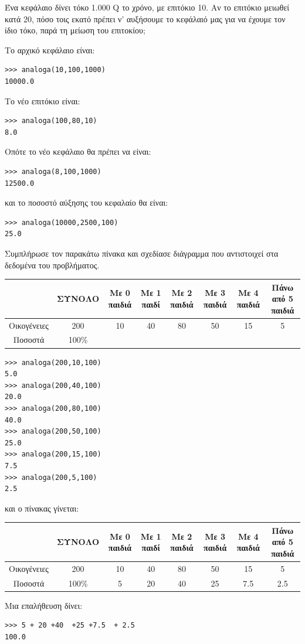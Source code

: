 \begin{exercise}
Ένα	κεφάλαιο	δίνει	τόκο	1.000	Q	το	χρόνο,	με	επιτόκιο	10.	Αν	το	επιτόκιο	μειωθεί	κατά	20,	πόσο	τοις	εκατό	πρέπει	ν’	αυξήσουμε	το	κεφάλαιό	μας	για	να	έχουμε	τον	ίδιο	τόκο,	παρά	τη	μείωση	του	επιτοκίου;
\end{exercise}
Το αρχικό κεφάλαιο είναι:
\begin{lstlisting}
>>> analoga(10,100,1000)
10000.0
\end{lstlisting}
Το νέο επιτόκιο είναι:
\begin{lstlisting}
>>> analoga(100,80,10)
8.0
\end{lstlisting}
Οπότε το νέο κεφάλαιο θα πρέπει να είναι:
\begin{lstlisting}
>>> analoga(8,100,1000)
12500.0
\end{lstlisting}
και το ποσοστό αύξησης του κεφαλαίο θα είναι:
\begin{lstlisting}
>>> analoga(10000,2500,100)
25.0
\end{lstlisting}
\begin{exercise}
 Συμπλήρωσε	τον	παρακάτω	πίνακα	και	σχεδίασε	διάγραμμα	που	αντιστοιχεί	στα	δεδομένα	του	προβλήματος.
\begin{table}
\begin{tabular}{|c|c|c|c|c|c|c|c|}\hline
 &ΣΥΝΟΛΟ & Με 0 παιδιά & Με 1 παιδί & Με 2 παιδιά & Με 3 παιδιά & Με 4 παιδιά & Πάνω από 5 παιδιά     \\\hline
Οικογένειες &200 & 10 & 40 & 80 & 50 & 15 & 5     \\\hline
Ποσοστά & 100\%& &  &  & &  &     \\\hline
\end{tabular}
\end{table}
\end{exercise}
\begin{lstlisting}
>>> analoga(200,10,100)
5.0
>>> analoga(200,40,100)
20.0
>>> analoga(200,80,100)
40.0
>>> analoga(200,50,100)
25.0
>>> analoga(200,15,100)
7.5
>>> analoga(200,5,100)
2.5
\end{lstlisting}
και ο πίνακας γίνεται:
\begin{table}
\begin{tabular}{|c|c|c|c|c|c|c|c|}\hline
 &ΣΥΝΟΛΟ & Με 0 παιδιά & Με 1 παιδί & Με 2 παιδιά & Με 3 παιδιά & Με 4 παιδιά & Πάνω από 5 παιδιά     \\\hline
Οικογένειες &200 & 10 & 40 & 80 & 50 & 15 & 5     \\\hline
Ποσοστά & 100\%&5 & 20 &40  &25 &7.5  & 2.5    \\\hline
\end{tabular}
\end{table}
Μια επαλήθευση δίνει:
\begin{lstlisting}
>>> 5 + 20 +40  +25 +7.5  + 2.5   
100.0
\end{lstlisting}
